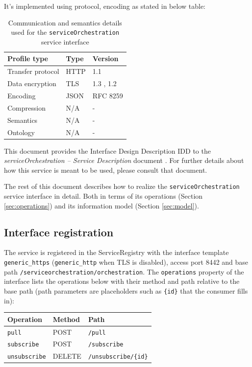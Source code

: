 \documentclass[a4paper]{arrowhead}
\begin{document}
It's implemented using protocol, encoding as stated in below table:
\begin{table}[ht!]
  \centering
  \begin{tabular}{|l|l|l|}
    \hline
    \rowcolor{gray!33} Profile type & Type & Version \\ \hline
    Transfer protocol & HTTP & 1.1 \cite{rfc9112} \\ \hline
    Data encryption & TLS & 1.3 \cite{rfc8446}, 1.2 \cite{rfc5246} \\ \hline
    Encoding & JSON & RFC 8259 \cite{rfc8259} \\ \hline
    Compression & N/A & - \\ \hline
    Semantics & N/A & - \\ \hline
    Ontology & N/A & - \\ \hline
  \end{tabular}
  \caption{Communication and semantics details used for the \texttt{service\allowbreak{}Orchestration} service interface}
  \label{tab:comunication_semantics_profile}
\end{table}

This document provides the Interface Design Description IDD to the \textit{serviceOrchestration -- Service Description} document \cite{ssso-serviceOrchestration-sd}.
For further details about how this service is meant to be used, please consult that document.

The rest of this document describes how to realize the \texttt{service\allowbreak{}Orchestration} service
interface in detail. Both in terms of its operations (Section \ref{sec:operations}) and its information model (Section \ref{sec:model}).

\subsection{Interface registration}

The service is registered in the ServiceRegistry with the interface template \texttt{generic\_\allowbreak{}https} (\texttt{generic\_\allowbreak{}http} when TLS is disabled), access port 8442 and base path \texttt{/\allowbreak{}serviceorchestration/\allowbreak{}orchestration}. The \texttt{operations} property of the interface lists the operations below with their method and path relative to the base path (path parameters are placeholders such as \texttt{\{id\}} that the consumer fills in):

\noindent\begin{longtable}{| p{5.2cm} | p{1.6cm} | p{8.4cm} |} \hline
\rowcolor{gray!33} Operation & Method & Path \\ \hline \endhead
\texttt{pull} & POST & \texttt{/\allowbreak{}pull} \\ \hline
\texttt{subscribe} & POST & \texttt{/\allowbreak{}subscribe} \\ \hline
\texttt{unsubscribe} & DELETE & \texttt{/\allowbreak{}unsubscribe/\allowbreak{}\{id\}} \\ \hline
\end{longtable}
\end{document}
